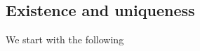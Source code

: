 \documentclass[12pt,a4paper]{article}
\numberwithin{equation}{subsection}
\numberwithin{lemma}{subsection}
\newtheorem{proposition}[lemma]{Proposition}
\theoremstyle{definition}
\newcommand{\real}{\mathbb{R}}
\begin{document}
\subsection{Existence and uniqueness}



We start with the following
\end{document}
